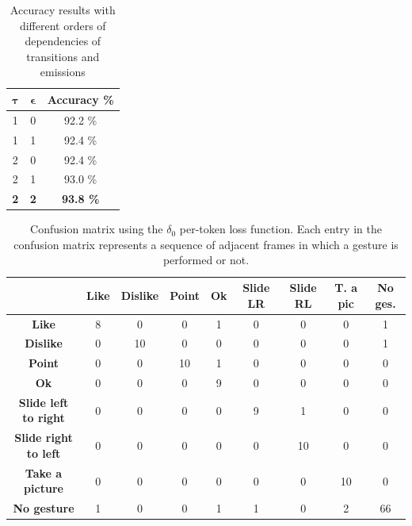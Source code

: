 \begin{table}
\begin{center}
\begin{tabular}{|c|c|c|}
\hline
$\mathbf{\tau}$ & $\mathbf{\epsilon}$ & \textbf{Accuracy \%} \\
\hline
\hline
1							& 0							& 92.2 \% \\
1							& 1							& 92.4 \% \\
2							& 0							& 92.4 \% \\
2							& 1							& 93.0 \% \\
\textbf{2}						& \textbf{2}						& \textbf{93.8 \%} \\
\hline
\end{tabular}
\end{center}
\caption{Accuracy results with different orders of dependencies of transitions and emissions}
\label{transemis}
\end{table}

\begin{table}
\begin{center}
\begin{tabular}{|c|c|c|c|c|c|c|c|c|}
\hline
 	& \textbf{Like}	& \textbf{Dislike}	&\textbf{Point}	&\textbf{Ok}	&\textbf{Slide LR}	&\textbf{Slide RL}	&\textbf{T. a pic}	& \textbf{No ges.} \\
\hline
\hline
 \textbf{Like}   & 8 & 0 & 0 & 1 & 0 & 0 & 0 & 1 \\
\textbf{Dislike}   & 0 & 10 & 0 & 0 & 0 & 0 & 0 & 1 \\
\textbf{Point}  & 0 & 0 & 10 & 1 & 0 & 0 & 0 & 0 \\
\textbf{Ok}  & 0 & 0 & 0 & 9 & 0 & 0 & 0 & 0 \\
\textbf{Slide left to right}  & 0 & 0 & 0 & 0 & 9 & 1 & 0 & 0 \\
\textbf{Slide right to left}  & 0 & 0 & 0 & 0 & 0 & 10 & 0 & 0 \\
\textbf{Take a picture}  & 0 & 0 & 0 & 0 & 0 & 0 & 10 & 0 \\
\textbf{No gesture}   & 1 & 0 & 0 & 1 & 1 & 0 & 2 & 66 \\
\hline
\end{tabular}
\end{center}
\caption{Confusion matrix using the $\delta_0$ per-token loss function. Each entry in the confusion matrix represents a sequence of adjacent frames in which a gesture is performed or not.}
\label{losses0}
\end{table}

